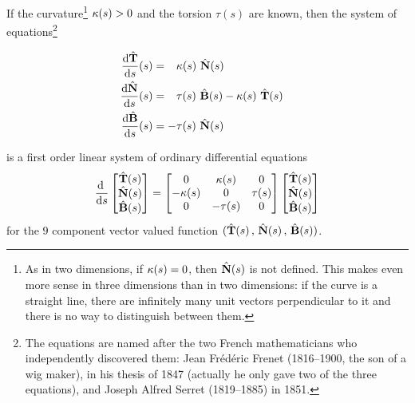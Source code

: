If the curvature\footnote{As in two dimensions, if $\kappa(s)=0$, then
$\hat{\mathbf{N}}(s)$ is not defined. This makes even more sense in three dimensions
than in two dimensions: if the curve is a straight line, there are 
infinitely many unit vectors perpendicular to it and there is no way to 
distinguish between them.} $\kappa(s)>0$ 
and the torsion $\tau(s)$ are known,
then the system of equations\footnote{The equations are named after 
the two French mathematicians who independently discovered them: 
Jean Fr\'ed\'eric Frenet (1816--1900, the son of a wig maker), 
in his thesis of 1847
(actually he only gave two of the three equations), and 
Joseph Alfred Serret (1819--1885) in 1851. 
}
\begin{impeqn}\label{eqn:FrenetSerret}
\begin{align*}
\diff{\hat\vT}{s}(s)&=\phantom{-}\ka(s)\ \hat\vN(s)\cr
\diff{\hat\vN}{s}(s)&=\phantom{-}\tau(s)\ \hat\vB(s)-\ka(s)\ \hat\vT(s)\cr
\diff{\hat\vB}{s}(s)&=-\tau(s)\ \hat\vN(s)\cr
\end{align*}
\end{impeqn}\noindent
is a first order linear system of ordinary differential equations 
\begin{align*}
\diff{}{s}
\left[ \begin{matrix}\hat\vT(s)\\ \hat\vN(s)\\ \hat\vB(s)\end{matrix} \right]
=\left[\begin{matrix} 0      & \ka(s) & 0\\
              -\ka(s) &  0     &\tau(s) \\
              0       &-\tau(s)  & 0 \end{matrix}\right]
\left[\begin{matrix}\hat\vT(s)\\ \hat\vN(s)\\ \hat\vB(s)\end{matrix}\right]
\end{align*}
for the $9$ component vector valued function
$(\hat{\mathbf{T}}(s)\,,\,\hat{\mathbf{N}}(s)\,,\,\hat{\mathbf{B}}(s))$. 

